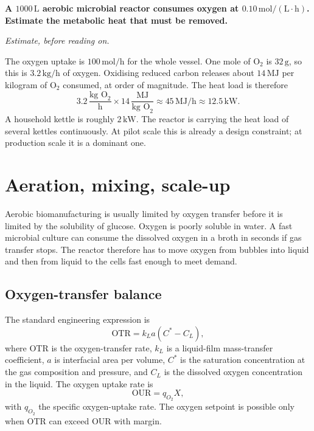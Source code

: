 \begin{estimation}
\textbf{A $1000\,\text{L}$ aerobic microbial reactor consumes oxygen
at $0.10\,\text{mol}/(\text{L}\cdot\text{h})$. Estimate the metabolic
heat that must be removed.}

\smallskip
\textit{Estimate, before reading on.}

\smallskip
The oxygen uptake is $100\,\text{mol}/\text{h}$ for the whole vessel.
One mole of O$_2$ is $32\,\text{g}$, so this is
$3.2\,\text{kg}/\text{h}$ of oxygen. Oxidising reduced carbon releases
about $14\,\text{MJ}$ per kilogram of O$_2$ consumed, at order of
magnitude. The heat load is therefore
\[
3.2\,\frac{\text{kg O}_2}{\text{h}}
\times 14\,\frac{\text{MJ}}{\text{kg O}_2}
\approx 45\,\text{MJ}/\text{h}
\approx 12.5\,\text{kW}.
\]
A household kettle is roughly $2\,\text{kW}$. The reactor is carrying
the heat load of several kettles continuously. At pilot scale this is
already a design constraint; at production scale it is a dominant one.
\end{estimation}

\section{Aeration, mixing, scale-up}

Aerobic biomanufacturing is usually limited by oxygen transfer before it
is limited by the solubility of glucose. Oxygen is poorly soluble in
water. A fast microbial culture can consume the dissolved oxygen in a
broth in seconds if gas transfer stops. The reactor therefore has to
move oxygen from bubbles into liquid and then from liquid to the cells
fast enough to meet demand.

\subsection{Oxygen-transfer balance}

The standard engineering expression is
\[
\text{OTR} = k_L a (C^\ast - C_L),
\]
where OTR is the oxygen-transfer rate, $k_L$ is a liquid-film
mass-transfer coefficient, $a$ is interfacial area per volume,
$C^\ast$ is the saturation concentration at the gas composition and
pressure, and $C_L$ is the dissolved oxygen concentration in the liquid.
The oxygen uptake rate is
\[
\text{OUR} = q_{O_2} X,
\]
with $q_{O_2}$ the specific oxygen-uptake rate. The oxygen setpoint is
possible only when OTR can exceed OUR with margin.



